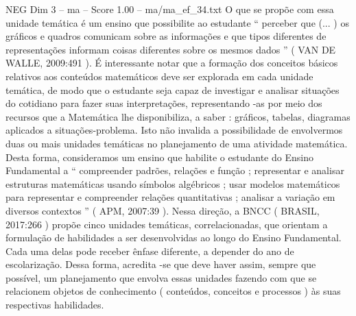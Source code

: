 \begin{textsample}{NEG Dim 3 – ma – Score 1.00 – ma/ma\_ef\_34.txt}
O que se propõe com essa unidade temática é um ensino que possibilite ao estudante “ perceber que (... ) os gráficos e quadros comunicam sobre as informações e que tipos diferentes de representações informam coisas diferentes sobre os mesmos dados ” ( VAN DE WALLE, 2009:491 ).
É interessante notar que a formação dos conceitos básicos relativos aos conteúdos matemáticos deve ser explorada em cada unidade temática, de modo que o estudante seja capaz de investigar e analisar situações do cotidiano para fazer suas interpretações, representando -as por meio dos recursos que a Matemática lhe disponibiliza, a saber : gráficos, tabelas, diagramas aplicados a situações-problema.
Isto não invalida a possibilidade de envolvermos duas ou mais unidades temáticas no planejamento de uma atividade matemática.
Desta forma, consideramos um ensino que habilite o estudante do Ensino Fundamental a “ compreender padrões, relações e função ; representar e analisar estruturas matemáticas usando símbolos algébricos ; usar modelos matemáticos para representar e compreender relações quantitativas ; analisar a variação em diversos contextos ” ( APM, 2007:39 ).
Nessa direção, a BNCC ( BRASIL, 2017:266 ) propõe cinco unidades temáticas, correlacionadas, que orientam a formulação de habilidades a ser desenvolvidas ao longo do Ensino Fundamental.
Cada uma delas pode receber ênfase diferente, a depender do ano de escolarização.
Dessa forma, acredita -se que deve haver assim, sempre que possível, um planejamento que envolva essas unidades fazendo com que se relacionem objetos de conhecimento ( conteúdos, conceitos e processos ) às suas respectivas habilidades.

\end{textsample}
